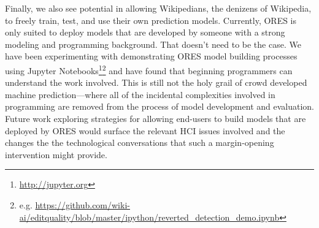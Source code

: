 Finally, we also see potential in allowing Wikipedians, the denizens of Wikipedia, to freely train, test, and use their own prediction models.  Currently, ORES is only suited to deploy models that are developed by someone with a strong modeling and programming background.  That doesn't need to be the case.  We have been experimenting with demonstrating ORES model building processes using Jupyter Notebooks\footnote{\url{http://jupyter.org}}\footnote{e.g. \url{ https://github.com/wiki-ai/editquality/blob/master/ipython/reverted_detection_demo.ipynb}} and have found that beginning programmers can understand the work involved.  This is still not the holy grail of crowd developed machine prediction---where all of the incidental complexities involved in programming are removed from the process of model development and evaluation.  Future work exploring strategies for allowing end-users to build models that are deployed by ORES would surface the relevant HCI issues involved and the changes the the technological conversations that such a margin-opening intervention might provide.

